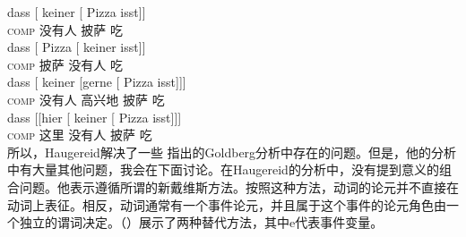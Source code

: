 \begin{exe}
\begin{xlist}[iv.]
\begin{exe}
\begin{xlist}[iv.]
\eal
\ex 
\gll dass [ keiner [ Pizza isst]]\\
     \textsc{comp} {} 没有人 {} 披萨 吃\\
\ex 
\gll dass [ Pizza [ keiner isst]]\\
	 \textsc{comp} {} 披萨 {} 没有人 吃\\
\ex 
\gll dass [ keiner [gerne [ Pizza isst]]]\\
	 \textsc{comp} {} 没有人 \spacebr{}高兴地 {} 披萨 吃\\
\ex 
\gll dass [[hier              [ keiner [ Pizza isst]]]\\
     \textsc{comp} \hspaceThis{[[}这里 {}          没有人 {} 披萨 吃\\
\zl
所以，Haugereid解决了一些 指出的Goldberg分析中存在的问题。但是，他的分析中有大量其他问题，我会在下面讨论。在Haugereid的分析中，没有提到意义的组合问题。他表示遵循所谓的新戴维斯方法。按照这种方法，动词的论元并不直接在动词上表征。相反，动词通常有一个事件论元，并且属于这个事件的论元角色由一个独立的谓词决定。（）展示了两种替代方法，其中e代表事件变量。

\end{xlist}
\end{exe}
\end{xlist}
\end{exe}
